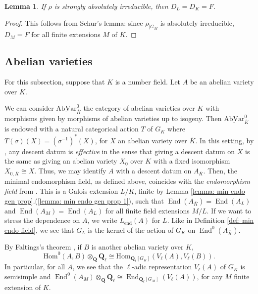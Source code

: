 \documentclass[a4paper,10pt]{amsart}
\theoremstyle{plain}
\newtheorem{lemma}[theorem]{Lemma}
\theoremstyle{definition}
\theoremstyle{remark}
\def\Q{\mathbf Q}
\newcommand{\Ql}{\Q_{\ell}}
\def\mr#1{\mathrm{#1}}
\def\AbVar{\underline{\mathrm{AbVar}}}
\renewcommand{\hom}{\mr{Hom}}
\DeclareMathOperator{\End}{End}
\begin{document}
\begin{lemma}\label{lemma: strongly abs irred min end field}
If \(\rho\) is strongly absolutely irreducible, then \(D_L = D_K=F\).
\end{lemma}
\begin{proof}
This follows from Schur's lemma: since \(\rho_{|G_M}\) is absolutely irreducible, 
\(D_M=F\) for all finite extensions \(M\) of \(K\). 
\end{proof}

\subsection{Abelian varieties}\label{ssec: min endo for abvars}
For this subsection, suppose that \(K\) is a number field. Let \(A\) be an abelian variety over \(K\).

We can consider \(\AbVar_{\overline{K}}^0\) the category of abelian varieties over \(\overline{K}\) with morphisms given by morphisms of abelian varieties up to isogeny. Then \(\AbVar_{\overline{K}}^0\) is endowed with a natural categorical action \(T\) of \(G_K\) where \(T(\sigma)(X) = (\sigma^{-1})^\ast(X)\), for \(X\) an abelian variety over \(\overline{K}\). In this setting, by \cite{sga1, weildescent}, any descent datum is \emph{effective} in the sense that giving a descent datum on \(X\) is the same as giving an abelian variety \(X_0\) over \(K\) with a fixed isomorphism \(X_{0, \overline{K}} \cong X\). Thus, we may identify \(A\) with a descent datum on \(A_{\overline{K}}\). Then, the minimal endomorphism field, as defined above, coincides with the \emph{endomorphism field} from \cite{guralnickkedlaya}. This is a Galois extension \(L/K\), finite by Lemma \ref{lemma: min endo gen prop}.(\ref{lemma: min endo gen prop 1}), such that \(\End(A_{\overline{K}})=\End(A_{L})\) and \(\End(A_M)=\End(A_{L})\) for all finite field extensions \(M/L\). If we want to stress the dependence on $A$, we write $L_\mr{end}(A)$ for $L$. Like in Definition \ref{def: min endo field}, we see that \(G_{L}\) is the kernel of the action of \(G_K\) on \(\End^0(A_{\overline{K}})\).


By Faltings's theorem \cite{faltings}, if \(B\) is another abelian variety over \(K\),
\[
    \hom^0(A, B)\otimes_\Q \Ql \cong \hom_{\Ql[G_K]}(V_\ell(A), V_\ell(B)).
\]
In particular, for all \(A\), we see that the \(\ell\)-adic representation \(V_\ell(A)\) of \(G_K\) is semisimple and \(\End^0(A_{M}) \otimes_{\Q} \Ql \cong \End_{\Ql[G_M]}(V_\ell(A))\), for any \(M\) finite extension of \(K\).
\end{document}
